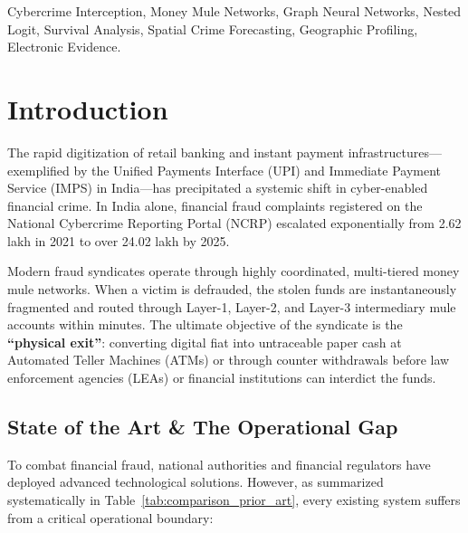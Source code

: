 \documentclass[conference]{IEEEtran}
\begin{document}
\begin{IEEEkeywords}
Cybercrime Interception, Money Mule Networks, Graph Neural Networks, Nested Logit, Survival Analysis, Spatial Crime Forecasting, Geographic Profiling, Electronic Evidence.
\end{IEEEkeywords}

\section{Introduction}
The rapid digitization of retail banking and instant payment infrastructures---exemplified by the Unified Payments Interface (UPI) and Immediate Payment Service (IMPS) in India---has precipitated a systemic shift in cyber-enabled financial crime. In India alone, financial fraud complaints registered on the National Cybercrime Reporting Portal (NCRP) escalated exponentially from 2.62 lakh in 2021 to over 24.02 lakh by 2025. 

Modern fraud syndicates operate through highly coordinated, multi-tiered money mule networks. When a victim is defrauded, the stolen funds are instantaneously fragmented and routed through Layer-1, Layer-2, and Layer-3 intermediary mule accounts within minutes. The ultimate objective of the syndicate is the \textbf{``physical exit''}: converting digital fiat into untraceable paper cash at Automated Teller Machines (ATMs) or through counter withdrawals before law enforcement agencies (LEAs) or financial institutions can interdict the funds.

\subsection{State of the Art \& The Operational Gap}
To combat financial fraud, national authorities and financial regulators have deployed advanced technological solutions. However, as summarized systematically in Table~\ref{tab:comparison_prior_art}, every existing system suffers from a critical operational boundary:
\end{document}

